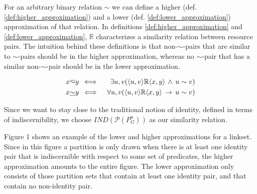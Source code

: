 For an arbitrary binary relation $\sim$ we can define
  a higher (def. \ref{def:higher_approximation}) and
  a lower (def. \ref{def:lower_approximation}) approximation
  of that relation.
In definitions \ref{def:higher_approximation} and
  \ref{def:lower_approximation},
  $\mathbb{R}$ characterizes a similarity relation between resource pairs.
The intuition behind these definitions is that non-$\sim$-pairs
  that are similar to $\sim$-pairs should be in the higher approximation,
  whereas no $\sim$-pair that has a similar non-$\sim$-pair should be
  in the lower approximation.

\small
\begin{definition}
\begin{align}
\label{def:higher_approximation}
x \overline{\sim} y \, & \iff & \,
  \exists u,v (\langle u,v\rangle \mathbb{R} \langle x,y\rangle \,\land\, u \sim v)
\\
\label{def:lower_approximation}
x \underline{\sim} y \, & \iff & \,
  \forall u,v (\langle u,v\rangle \mathbb{R} \langle x,y\rangle \,\rightarrow\, u \sim v)
\end{align}
\end{definition}
\normalsize 

\begin{comment}
\small
\begin{definition}[Higher \& lower approximation]
\label{def:higher_lower_approximation}
\begin{align}
  y \in [x]_H
\,\iff\,\\
  \exists u (
      \card{[u]_{\sim}}>1
    \,\land\,
      \mathbb{P}([u]_{\sim})=\mathbb{P}(\set{x,y})
  )\nonumber
\\
  y \in [x]_L
\,\iff\,
  \forall S \subseteq D (\\
      (\card{S}>1 \,\land\, \mathbb{P}(S) = \mathbb{P}(\set{x,y}))
    \,\rightarrow\,
      \exists s \in D (S=[s]_{\sim})
  )\nonumber
\end{align}
\end{definition}
\normalsize
\end{comment}

\noindent Since we want to stay close to the traditional notion of identity,
  defined in terms of indiscernibility,
  we choose $\mathit{IND}(\mathcal{P}(P_G^n))$ as our similarity relation.

Figure 1 shows an example of the lower and higher
  approximations for a linkset.
Since in this figure a partition is only drawn when there is at least one
  identity pair that is indiscernible with respect to some set of
  predicates, the higher approximation amounts to the entire figure.
The lower approximation only consists of those partition sets that contain
  at least one identity pair, and that contain no non-identity pair.

